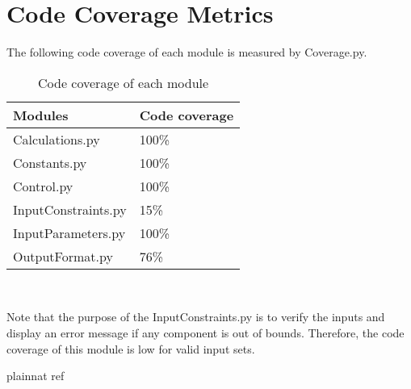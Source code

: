 \documentclass[12pt, titlepage]{article}
\begin{document}
\section{Code Coverage Metrics}
The following code coverage of each module is measured by Coverage.py.
\begin{table}[h!]
	\centering
	\begin{tabular}{l l} 
		\toprule		
		\textbf{Modules} & \textbf{Code coverage}\\
		\midrule 
		Calculations.py & 100\% \\
		Constants.py & 100\% \\
		Control.py & 100\% \\
		InputConstraints.py & 15\% \\
		InputParameters.py & 100\% \\
		OutputFormat.py & 76\% \\
		\bottomrule
	\end{tabular}\\
	
	\caption{Code coverage of each module} 
	\label{Tblcodecov}
\end{table}	

Note that the purpose of the InputConstraints.py is to verify the inputs and 
display an error message if any component is out of bounds. Therefore, the code 
coverage of this module is low for valid input sets.

\newpage

\nocite{*}
 {plainnat}
 {ref}
\end{document}
